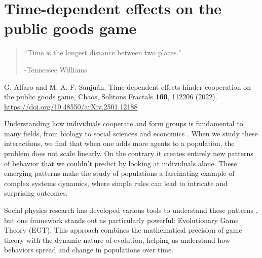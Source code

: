 \chapter{Time-dependent effects on the public goods game} %
\label{chap:TimeEffects}



\begin{quotation}

	\vspace{-3cm}

    \begin{flushright}
    \begin{minipage}[t][5cm][b]{0.5\textwidth}
    { ``Time is the longest distance between two places."}
    
    \bigskip
    
    -{\small  Tennessee Williams}
    \end{minipage}
    \end{flushright}
    
    \vspace{0.5cm}
\end{quotation}


\vspace{0.5cm}

G. Alfaro and M. A. F. Sanjuán,
Time-dependent effects hinder cooperation on the public goods game,
Chaos, Solitons Fractals \textbf{160}, 112206 (2022).
\url{https://doi.org/10.48550/arXiv.2501.12188}

\vspace{1cm}


Understanding how individuals cooperate and form groups is fundamental to many fields, from biology to social sciences and economics \cite{CoopBio,CoopSocial,CoopEconomy}. When we study these interactions, we find that when one adds more agents to a population, the problem does not scale linearly. On the contrary it creates entirely new patterns of behavior that we couldn't predict by looking at individuals alone. These emerging patterns make the study of populations a fascinating example of complex systems dynamics, where simple rules can lead to intricate and surprising outcomes.

Social physics research has developed various tools to understand these patterns \cite{SocialPhy}, but one framework stands out as particularly powerful: Evolutionary Game Theory (EGT). This approach combines the mathematical precision of game theory with the dynamic nature of evolution, helping us understand how behaviors spread and change in populations over time.

